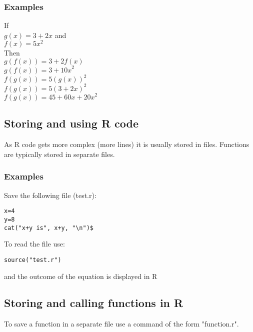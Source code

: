 \documentclass[12pt,a4paper]{article}
\theoremstyle{regla}
\theoremstyle{remark}
\theoremstyle{definition}
\theoremstyle{nonumberbreak}
\begin{document}
\subsubsection{Examples}
\begin{xmpl}
If\\
$  g(x)= {3}+ {2}x$  and \\
$f(x) = {5}{x}^2$\\
Then \\
$g(f(x)) = {3} +{2} f(x)$\\
$g(f(x)) = {3} +{10x}^2$\\
   
$f(g(x)) = {5}{(g(x))}^2$\\
$f(g(x)) = {5}{({3}+{2x})}^2$\\
$f(g(x)) = {45}+{60x}+{20x}^2$\\
\end{xmpl}

\subsection{Storing and using R code}
\begin{fbox}
\begin{minipage}{0.97\textwidth}
As R code gets more complex (more lines) it is usually stored in files. Functions are typically stored in separate files.
\end{minipage}
\end{fbox}
\subsubsection{Examples}
\begin{xmpl}
Save the following file (test.r):
\begin{lstlisting}
x=4
y=8
cat("x+y is", x+y, "\n")$
\end{lstlisting}
To read the file use: 
\begin{lstlisting}
source("test.r")
\end{lstlisting}
and the outcome of the equation is displayed in R
\end{xmpl}

\subsection{Storing and calling functions in R}
\begin{fbox}
\begin{minipage}{0.97\textwidth}
To save a function in a separate file use a command of the form "function.r".
\end{minipage}
\end{fbox}
\end{document}
